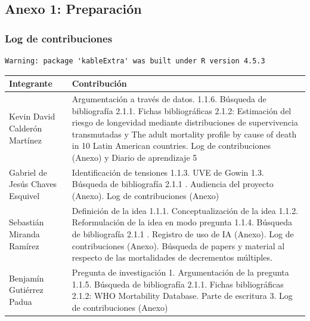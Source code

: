 \documentclass[
  letterpaper,
  DIV=11,
  numbers=noendperiod]{scrartcl}
\begin{document}
\subsection{Anexo 1: Preparación}\label{anexo-1-preparaciuxf3n}

\subsubsection{Log de contribuciones}\label{log-de-contribuciones}

\begin{verbatim}
Warning: package 'kableExtra' was built under R version 4.5.3
\end{verbatim}

\begin{longtable*}[t]{>{\raggedright\arraybackslash}p{5cm}>{\raggedright\arraybackslash}p{10cm}}
\toprule
Integrante & Contribución\\
\midrule
Kevin David Calderón Martínez & Argumentación a través de datos. 1.1.6. Búsqueda de bibliografía 2.1.1. Fichas bibliográficas 2.1.2: Estimación del riesgo de longevidad mediante distribuciones de supervivencia transmutadas y The adult mortality profile by cause of death in 10 Latin American countries. Log de contribuciones (Anexo) y Diario de aprendizaje 5\\
Gabriel de Jesús Chaves Esquivel & Identificación de tensiones 1.1.3. UVE de Gowin 1.3. Búsqueda de bibliografía 2.1.1 . Audiencia del proyecto (Anexo). Log de contribuciones (Anexo)\\
Sebastián Miranda Ramírez & Definición de la idea 1.1.1. Conceptualización de la idea 1.1.2. Reformulación de la idea en modo pregunta 1.1.4. Búsqueda de bibliografía 2.1.1 . Registro de uso de IA (Anexo). Log de contribuciones (Anexo). Búsqueda de papers y material al respecto de las mortalidades de decrementos múltiples.\\
Benjamín Gutiérrez Padua & Pregunta de investigación 1. Argumentación de la pregunta 1.1.5. Búsqueda de bibliografía 2.1.1. Fichas bibliográficas 2.1.2: WHO Mortability Database. Parte de escritura 3. Log de contribuciones (Anexo)\\
\bottomrule
\end{longtable*}
\end{document}
